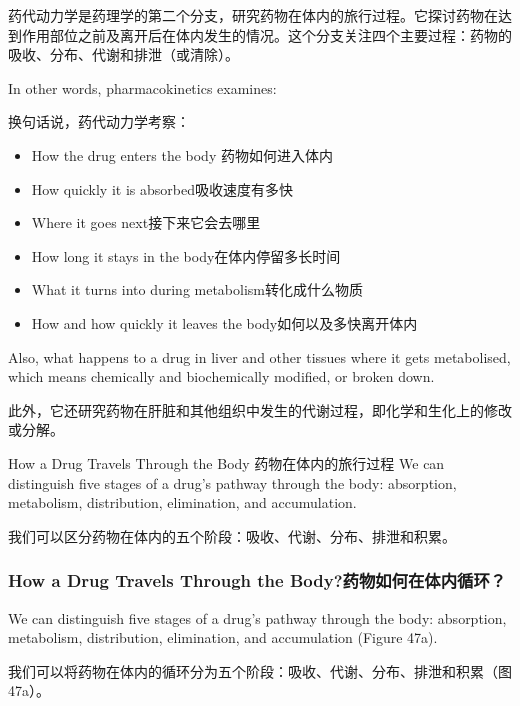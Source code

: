 \documentclass[dvipsnames, svgnames,a4paper,11pt]{article}
\begin{document}
药代动力学是药理学的第二个分支，研究药物在体内的旅行过程。它探讨药物在达到作用部位之前及离开后在体内发生的情况。这个分支关注四个主要过程：药物的吸收、分布、代谢和排泄（或清除）。

In other words, pharmacokinetics examines:

换句话说，药代动力学考察：
\begin{itemize}

      \item How the drug enters the body 药物如何进入体内

      \item How quickly it is absorbed吸收速度有多快

      \item Where it goes next接下来它会去哪里

      \item How long it stays in the body在体内停留多长时间

      \item What it turns into during metabolism转化成什么物质

      \item How and how quickly it leaves the body如何以及多快离开体内

\end{itemize}

Also, what happens to a drug in liver and other tissues where it gets metabolised, which means chemically and biochemically modified, or broken down.


此外，它还研究药物在肝脏和其他组织中发生的代谢过程，即化学和生化上的修改或分解。

How a Drug Travels Through the Body
药物在体内的旅行过程
We can distinguish five stages of a drug's pathway through the body: absorption, metabolism, distribution, elimination, and accumulation.

我们可以区分药物在体内的五个阶段：吸收、代谢、分布、排泄和积累。

\subsubsection{How a Drug Travels Through the Body?药物如何在体内循环？}


We can distinguish five stages of a drug's pathway through the body: absorption, metabolism, distribution, elimination, and accumulation (Figure 47a).

我们可以将药物在体内的循环分为五个阶段：吸收、代谢、分布、排泄和积累（图47a）。
\end{document}
